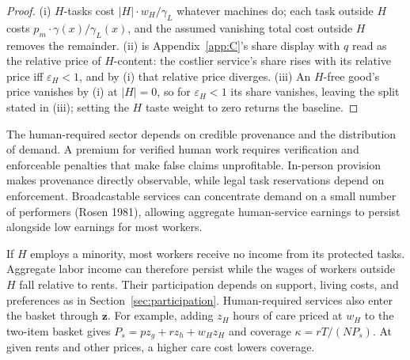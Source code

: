 \documentclass[12pt]{article}
\theoremstyle{plain}
\theoremstyle{definition}
\theoremstyle{remark}
\begin{document}
\begin{proof}
(i) $H$-tasks cost $|H|\cdot w_H/\gamma _L$ whatever machines do; each task outside $H$ costs $p_m\cdot \gamma (x)/\gamma _L(x)$, and the assumed vanishing total cost outside $H$ removes the remainder. (ii) is Appendix~\ref{app:C}'s share display with $q$ read as the relative price of $H$-content: the costlier service's share rises with its relative price iff $\varepsilon _H < 1$, and by (i) that relative price diverges. (iii) An $H$-free good's price vanishes by (i) at $|H| = 0$, so for $\varepsilon _H < 1$ its share vanishes, leaving the split stated in (iii); setting the $H$ taste weight to zero returns the baseline.
\end{proof}

The human-required sector depends on credible provenance and the distribution of demand. A premium for verified human work requires verification and enforceable penalties that make false claims unprofitable. In-person provision makes provenance directly observable, while legal task reservations depend on enforcement. Broadcastable services can concentrate demand on a small number of performers (Rosen 1981), allowing aggregate human-service earnings to persist alongside low earnings for most workers.

If $H$ employs a minority, most workers receive no income from its protected tasks. Aggregate labor income can therefore persist while the wages of workers outside $H$ fall relative to rents. Their participation depends on support, living costs, and preferences as in Section~\ref{sec:participation}. Human-required services also enter the basket through $\mathbf{z}$. For example, adding $z_H$ hours of care priced at $w_H$ to the two-item basket gives $P_s=pz_g+rz_h+w_Hz_H$ and coverage $\kappa=rT/(NP_s)$. At given rents and other prices, a higher care cost lowers coverage.

\end{document}

